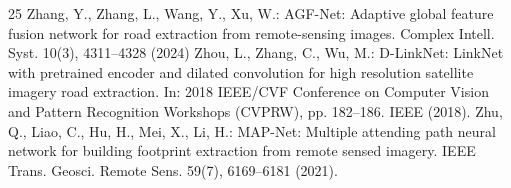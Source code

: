 \documentclass[runningheads]{llncs}
\begin{document}
\begin{thebibliography}{25}
 Zhang, Y., Zhang, L., Wang, Y., Xu, W.: AGF-Net: Adaptive global feature fusion network for road extraction from remote-sensing images. Complex Intell. Syst. 10(3), 4311--4328 (2024)
 Zhou, L., Zhang, C., Wu, M.: D-LinkNet: LinkNet with pretrained encoder and dilated convolution for high resolution satellite imagery road extraction. In: 2018 IEEE/CVF Conference on Computer Vision and Pattern Recognition Workshops (CVPRW), pp. 182--186. IEEE (2018). 
 Zhu, Q., Liao, C., Hu, H., Mei, X., Li, H.: MAP-Net: Multiple attending path neural network for building footprint extraction from remote sensed imagery. IEEE Trans. Geosci. Remote Sens. 59(7), 6169--6181 (2021). 
\end{thebibliography}
\end{document}
